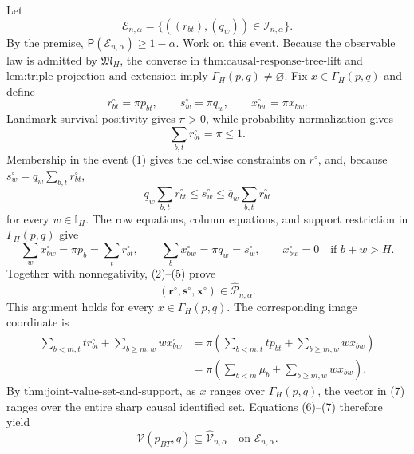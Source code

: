 Let
\[
 \mathcal E_{n,\alpha}
 =\{((r_{bt}),(q_w))\in\mathcal I_{n,\alpha}\}.             \tag{1}
\]
By the premise, \(\mathsf P(\mathcal E_{n,\alpha})\ge 1-\alpha\).  Work on this event.  Because the observable law is admitted by \(\mathfrak M_H\), the converse in \(\text{thm:causal-response-tree-lift}\) and \(\text{lem:triple-projection-and-extension}\) imply \(\Gamma_H(p,q)\ne\varnothing\).  Fix \(x\in\Gamma_H(p,q)\) and define
\[
 r^\circ_{bt}=\pi p_{bt},\qquad
 s^\circ_w=\pi q_w,\qquad
 x^\circ_{bw}=\pi x_{bw}.                                \tag{2}
\]
Landmark-survival positivity gives \(\pi>0\), while probability normalization gives
\[
 \sum_{b,t}r^\circ_{bt}=\pi\le 1.                         \tag{3}
\]
Membership in the event (1) gives the cellwise constraints on \(r^\circ\), and, because \(s^\circ_w=q_w\sum_{b,t}r^\circ_{bt}\),
\[
 \underline q_w\sum_{b,t}r^\circ_{bt}
 \le s^\circ_w
 \le \overline q_w\sum_{b,t}r^\circ_{bt}                 \tag{4}
\]
for every \(w\in\mathbb I_H\).  The row equations, column equations, and support restriction in \(\Gamma_H(p,q)\) give
\[
 \sum_wx^\circ_{bw}=\pi p_b=\sum_t r^\circ_{bt},\qquad
 \sum_bx^\circ_{bw}=\pi q_w=s^\circ_w,\qquad
 x^\circ_{bw}=0\quad\text{if }b+w>H.                    \tag{5}
\]
Together with nonnegativity, (2)--(5) prove
\[
 (\mathbf r^\circ,\mathbf s^\circ,\mathbf x^\circ)
 \in\widehat{\mathcal P}_{n,\alpha}.                    \tag{6}
\]
This argument holds for every \(x\in\Gamma_H(p,q)\).  The corresponding image coordinate is
\[
 \begin{aligned}
 \sum_{b<m,t}t r^\circ_{bt}+\sum_{b\ge m,w}w x^\circ_{bw}
 &=\pi\left(\sum_{b<m,t}t p_{bt}+\sum_{b\ge m,w}w x_{bw}\right)\\
 &=\pi\left(\sum_{b<m}\mu_b+\sum_{b\ge m,w}w x_{bw}\right).
 \end{aligned}                                            \tag{7}
\]
By \(\text{thm:joint-value-set-and-support}\), as \(x\) ranges over \(\Gamma_H(p,q)\), the vector in (7) ranges over the entire sharp causal identified set.  Equations (6)--(7) therefore yield
\[
 \mathcal V(p_{BT},q)\subseteq\widehat{\mathcal V}_{n,\alpha}
 \quad\text{on }\mathcal E_{n,\alpha}.                  \tag{8}
\]

